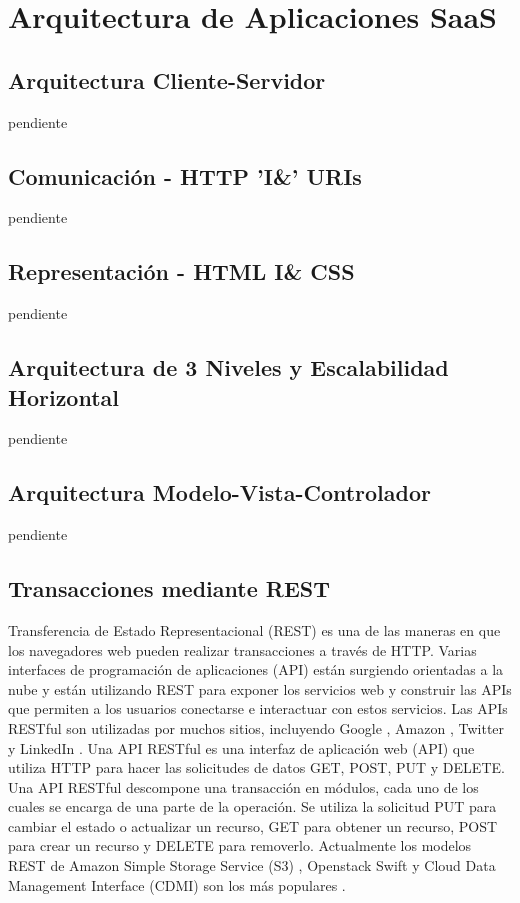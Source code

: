 \chapter{Arquitectura de Aplicaciones SaaS}

\section{Arquitectura Cliente-Servidor}
pendiente
\section{Comunicación - HTTP 'I\&' URIs}
pendiente
\section{Representación -  HTML I\& CSS}
pendiente
\section{Arquitectura de 3 Niveles y Escalabilidad Horizontal}
pendiente
\section{Arquitectura Modelo-Vista-Controlador}
pendiente
\section{Transacciones mediante REST}
Transferencia de Estado Representacional (REST) es una de las maneras en que los navegadores web pueden realizar transacciones a través de HTTP. Varias interfaces de programación de aplicaciones (API) están surgiendo orientadas a la nube y están utilizando REST para exponer los servicios web y construir las APIs que permiten a los usuarios conectarse e interactuar con estos servicios.
Las APIs RESTful son utilizadas por muchos sitios, incluyendo Google \parencite{Google-Inc2016-lm}, Amazon \parencite{Aws2016-iu}, Twitter \parencite{Twitter2016-df} y LinkedIn \parencite{LinkedIn2016-am}.
Una API RESTful es una interfaz de aplicación web (API) que utiliza HTTP para hacer las solicitudes de datos GET, POST, PUT y DELETE.
Una API RESTful descompone una transacción en módulos, cada uno de los cuales se encarga de una parte de la operación. Se utiliza la solicitud PUT para cambiar el estado o actualizar un recurso, GET para obtener un recurso, POST para crear un recurso y DELETE para removerlo. Actualmente los modelos REST de Amazon Simple Storage Service (S3) \parencite{Aws2016-tc}, Openstack Swift \parencite{OpenStack2016-ht} y Cloud Data Management Interface (CDMI) \parencite{Snia2016-vq} son los más populares \parencite{Richardson2008-ng}.

